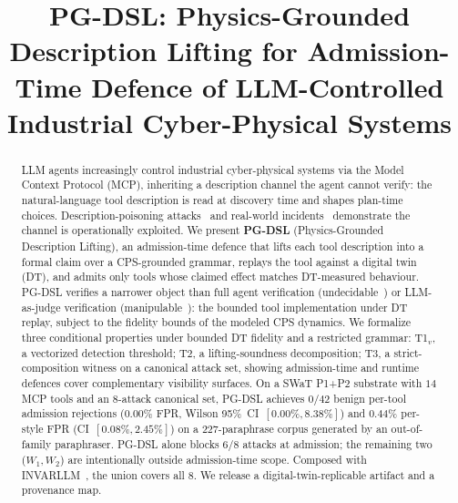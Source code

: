 \documentclass[conference,compsoc]{IEEEtran}
\title{{PG-DSL}: Physics-Grounded Description Lifting for
       Admission-Time Defence of {LLM}-Controlled Industrial
       Cyber-Physical Systems}
\author{\IEEEauthorblockN{Anonymous Authors}
        \IEEEauthorblockA{}}
\begin{document}
\maketitle

\begin{abstract}
LLM agents increasingly control industrial cyber-physical systems via
the Model Context Protocol (MCP), inheriting a description channel
the agent cannot verify: the natural-language tool description is
read at discovery time and shapes plan-time choices.
Description-poisoning attacks~\cite{mcp_misleading,when_mcp_attack}
and real-world
incidents~\cite{dragos_mexico_26} demonstrate the channel is
operationally exploited. We present \textbf{PG-DSL} (Physics-Grounded
Description Lifting), an admission-time defence that lifts each tool
description into a formal claim over a CPS-grounded grammar, replays
the tool against a digital twin (DT), and admits only tools whose
claimed effect matches DT-measured behaviour. PG-DSL verifies a
narrower object than full agent verification
(undecidable~\cite{trust_auth_sok}) or LLM-as-judge verification
(manipulable~\cite{gaming_judge}): the bounded tool implementation
under DT replay, subject to the fidelity bounds of the modeled CPS
dynamics. We formalize three conditional properties under bounded DT
fidelity and a restricted grammar: T1${}_v$, a vectorized detection
threshold; T2, a lifting-soundness decomposition; T3, a
strict-composition witness on a canonical attack set, showing
admission-time and runtime defences cover complementary visibility
surfaces.
On a SWaT P1+P2 substrate with $14$ MCP tools and an $8$-attack
canonical set, PG-DSL achieves $0/42$ benign per-tool admission
rejections ($0.00\%$ FPR, Wilson 95\%~CI~$[0.00\%, 8.38\%]$) and
$0.44\%$ per-style FPR (CI~$[0.08\%, 2.45\%]$) on a $227$-paraphrase
corpus generated by an out-of-family paraphraser. PG-DSL alone blocks
$6/8$ attacks at admission; the remaining two ($W_1, W_2$) are
intentionally outside admission-time scope. Composed with
INVARLLM~\cite{invarllm}, the union covers all $8$. We release a
digital-twin-replicable artifact and a provenance map.
\end{abstract}

\IEEEpeerreviewmaketitle














\end{document}
